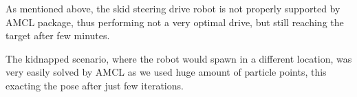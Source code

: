 \documentclass[10pt,journal,compsoc]{IEEEtran}
\begin{document}
    As mentioned above, the skid steering drive robot is not properly supported by AMCL package, thus performing not a very optimal drive, but still reaching the target after few minutes.

    The kidnapped scenario, where the robot would spawn in a different location, was very easily solved by AMCL as we used huge amount of particle points, this exacting the pose after just few iterations.
    
    
    
    
    
    
\end{document}
